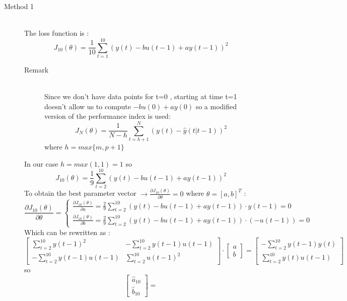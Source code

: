 \begin{description}
\item[Method 1]\hfill\\

The loss function is :
$$ J_{10}(\theta) = \frac{1}{10}\sum\limits_{t=1}^{10}(y(t) - bu(t-1)+ay(t-1))^2$$
\begin{description}
\item[Remark]\hfill\\
Since we don't have data points for t=0 , starting at time t=1 doesn't allow us to compute $-bu(0)+ay(0)$ so a modified version of the performance index is used:
\[
\boxed{J_N(\theta)= \frac{1}{N-h}\sum\limits_{t=h+1}^{N}(y(t)-\hat{y}(t|t-1))^2}
\]
where $h=max\{m,p+1\}$
\end{description}
In our case $h=max(1,1)=1$ so 
$$ J_{10}(\theta) = \frac{1}{9}\sum\limits_{t=2}^{10}(y(t) - bu(t-1)+ay(t-1))^2$$
To obtain the best parameter vector $\to \frac{\partial{J_{10}(\theta)}}{\partial{\theta}} = 0$ where $\theta = [a,b]^T$ :
\[ \frac{\partial{J_{10}(\theta)}}{\partial{\theta}} =
  \begin{cases}
        \frac{\partial{J_{10}(\theta)}}{\partial{a}} = \frac{2}{9} \sum\limits_{t=2}^{10}(y(t)-bu(t-1)+ay(t-1))\cdot y(t-1) = 0  \\
    		\frac{\partial{J_{10}(\theta)}}{\partial{b}} = \frac{2}{9} \sum\limits_{t=2}^{10}(y(t)-bu(t-1)+ay(t-1))\cdot (-u(t-1)) = 0  
  \end{cases}
\]
Which can be rewritten as : 
$$ 			\begin{bmatrix}
          \sum\limits_{t=2}^{10}y(t-1)^2 & -\sum\limits_{t=2}^{10}y(t-1)u(t-1) \\
          -\sum\limits_{t=2}^{10}y(t-1)u(t-1) & \sum\limits_{t=2}^{10}u(t-1)^2
             \end{bmatrix} \cdot
             \begin{bmatrix}
          	   a\\
               b
             \end{bmatrix}= 
             \begin{bmatrix}
          -\sum\limits_{t=2}^{10}y(t-1)y(t) \\
          \sum\limits_{t=2}^{10}y(t)u(t-1) 
             \end{bmatrix}
              $$ 
so
$$ 	\begin{bmatrix}
          	   \hat{a}_{10}\\
               \hat{b}_{10}
             \end{bmatrix} =
$$
\end{description}
